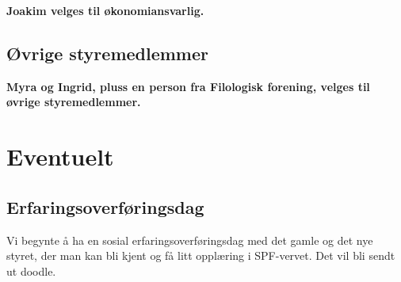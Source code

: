 \documentclass[a4paper,norsk]{article}
\begin{document}
\textbf{Joakim velges til økonomiansvarlig.}


\subsection{Øvrige styremedlemmer}
\textbf{Myra og Ingrid, pluss en person fra Filologisk forening, velges til øvrige styremedlemmer.}

\section{Eventuelt}
\subsection{Erfaringsoverføringsdag}
Vi begynte å ha en sosial erfaringsoverføringsdag med det gamle og det nye styret, der man kan bli kjent og få litt opplæring i SPF-vervet. Det vil bli sendt ut doodle. 
\end{document}
